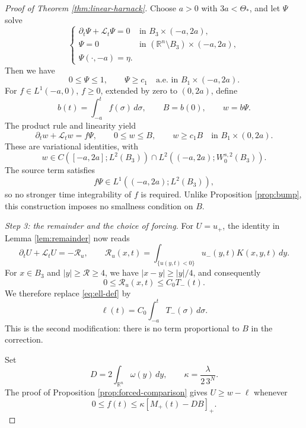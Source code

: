 \documentclass[10pt]{amsart}
\theoremstyle{plain}
\theoremstyle{definition}
\theoremstyle{remark}
\numberwithin{equation}{section}
\newcommand{\R}{\mathbb R}
\begin{document}
\begin{proof}[Proof of Theorem \ref{thm:linear-harnack}]
Choose $a>0$ with $3a<\Theta_*$, and let $\Psi$ solve
\[
\begin{cases}
\partial_t\Psi+\mathcal L_t\Psi=0
&\text{in }B_3\times(-a,2a),\\
\Psi=0&\text{in }(\R^n\setminus B_3)\times(-a,2a),\\
\Psi(\cdot,-a)=\eta.
\end{cases}
\]
Then we have
\[
0\le\Psi\le1,\qquad
\Psi\ge c_1\quad\text{a.e. in }B_1\times(-a,2a).
\]
For $f\in L^1(-a,0)$, $f\ge0$, extended by zero to $(0,2a)$,
define
\[
b(t)=\int_{-a}^t f(\sigma)\,d\sigma,\qquad B=b(0),\qquad w=b\Psi.
\]
The product rule and linearity yield
\begin{equation}\label{eq:linear-barrier}
\partial_tw+\mathcal L_tw=f\Psi,\qquad
0\le w\le B,\qquad
w\ge c_1B\quad\text{in }B_1\times(0,2a).
\end{equation}
These are variational identities, with
\[
w\in C([-a,2a];L^2(B_3))
\cap L^2((-a,2a);W^{s,2}_0(B_3)).
\]
The source term satisfies
\[
f\Psi\in L^1((-a,2a);L^2(B_3)),
\]
so no stronger time integrability of $f$ is required.
Unlike Proposition \ref{prop:bump}, this construction imposes no
smallness condition on $B$.

\smallskip
\noindent\emph{Step 3: the remainder and the choice of forcing.}
For $U=u_+$, the identity in Lemma \ref{lem:remainder} now reads
\[
\partial_tU+\mathcal L_tU=-\mathcal R_u,\qquad
\mathcal R_u(x,t)=\int_{\{u(y,t)<0\}}u_-(y,t)K(x,y,t)\,dy.
\]
For $x\in B_3$ and $|y|\ge\mathcal R\ge4$, we have
$|x-y|\ge|y|/4$, and consequently
\[
0\le\mathcal R_u(x,t)\le C_0T_-(t).
\]
We therefore replace \eqref{eq:ell-def} by
\begin{equation}\label{eq:linear-correction}
\ell(t)=C_0\int_{-a}^tT_-(\sigma)\,d\sigma.
\end{equation}
This is the second modification: there is no term proportional to
$B$ in the correction.

Set
\[
D=2\int_{\R^n}\omega(y)\,dy,\qquad
\kappa=\frac{\lambda}{2\,3^N}.
\]
The proof of Proposition \ref{prop:forced-comparison} gives
$U\ge w-\ell$ whenever
\begin{equation}\label{eq:linear-forcing-condition}
0\le f(t)\le\kappa[M_+(t)-DB]_+.
\end{equation}


\end{proof}
\end{document}
